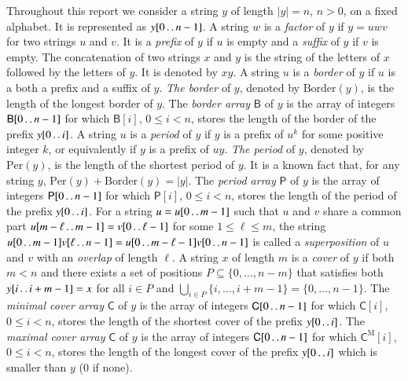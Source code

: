 \documentclass[preprint,12pt]{elsarticle}
\newcommand{\dd}{\mathinner{\ldotp\ldotp}}
\newcommand{\cpos}{\textit{P}}      %
\newcommand{\carr}{\textsf{C}}      %
\newcommand{\cmarr}{\textsf{C}^\mathrm{M}}      %
\newcommand{\parr}{\textsf{P}}      %
\newcommand{\barr}{\textsf{B}}      %
\newcommand{\Border}[1]{\ensuremath{\mathrm{Border}(#1)}}
\newcommand{\Per}[1]{\ensuremath{\mathrm{Per}(#1)}}
\begin{document}
Throughout this report we consider a string $y$ of length $|y| = n$, $n>0$, on a
fixed alphabet. It is represented as $y[0\dd n-1]$.
A string $w$ is a {\em factor} of $y$ if $y=uwv$ for two strings $u$ and $v$.
It is a {\em prefix} of $y$ if $u$ is empty and a {\em suffix} of $y$
if $v$ is empty.
The concatenation of two strings $x$ and $y$ is the string of the letters of $x$ followed by the letters of $y$. 
It is denoted by $xy$.
A string $u$ is a \textit{border} of $y$ if $u$ is a both a prefix and a suffix of $y$.
{\em The border} of $y$, denoted by $\Border{y}$,  is the length of the longest border of $y$.
The {\em border array} $\barr$ of $y$ is the array of integers $\barr[0 \dd n-1]$
for which $\barr[i]$, $0\leq i < n$, stores the length of the border of the prefix $y[0 \dd i]$.
A string $u$ is a \textit{period} of $y$ if $y$ is a prefix of $u^k$ for
some positive integer $k$, or equivalently if $y$ is a prefix of $uy$.
{\em The period} of $y$, denoted by $\Per{y}$, is the length of the shortest period of $y$.
It is a known fact that, for any string $y$, $\Per{y} + \Border{y} = |y|$.
The {\em period array} $\parr$ of $y$ is the array of integers $\parr[0 \dd n-1]$
for which $\parr[i]$, $0\leq i < n$, stores the length of the period of the prefix $y[0 \dd i]$.
For a string $u=u[0\dd m-1]$ such that $u$ and $v$ share a common part
 $u[m-\ell \dd m-1]=v[0\dd \ell-1]$ for some $1 \leq \ell \leq m$, the string
 $u[0\dd m-1]v[\ell\dd n-1]=u[0\dd m-\ell-1]v[0 \dd n-1]$ is called
 a {\em superposition} of $u$ and $v$ with an \textit{overlap} of length $\ell$.
A string $x$ of length $m$ is a {\em cover} of $y$ if both
$m<n$ and there exists a set of positions $\cpos \subseteq \{0, \ldots, n-m\}$
that satisfies both $y[i\dd i+m-1]=x$ for all $i\in \cpos$ and
$\bigcup_{i\in \cpos} \{ i,\ldots,i+m-1 \} = \{0,\ldots,n-1\}$.
The {\em minimal cover array} $\carr$ of $y$ is the array of integers $\carr[0 \dd n-1]$
for which $\carr[i]$, $0\leq i < n$, stores the length of the
shortest cover of the prefix $y[0 \dd i]$.
The {\em maximal cover array} $\carr$ of $y$ is the array of integers $\carr[0 \dd n-1]$
for which $\cmarr[i]$, $0\leq i < n$, stores the length of the longest cover of the prefix $y[0 \dd i]$ which is smaller than $y$ ($0$ if none).
\end{document}
